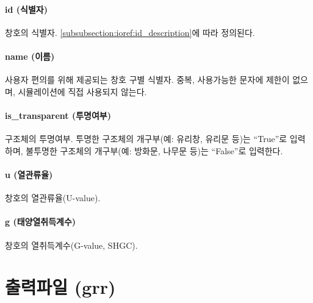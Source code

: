 
\paragraph{id (식별자)} 창호의 식별자. \ref{subsubsection:ioref:id_description}에 따라 정의된다.

\paragraph{name (이름)} 사용자 편의를 위해 제공되는 창호 구별 식별자. 중복, 사용가능한 문자에 제한이 없으며, 시뮬레이션에 직접 사용되지 않는다.

\paragraph{is\_transparent (투명여부)} 구조체의 투명여부. 투명한 구조체의 개구부(예: 유리창, 유리문 등)는 ``True''로 입력하며, 불투명한 구조체의 개구부(예: 방화문, 나무문 등)는 ``False''로 입력한다.

\paragraph{u (열관류율)} 창호의 열관류율(U-value).

\paragraph{g (태양열취득계수)} 창호의 열취득계수(G-value, SHGC).


\section{출력파일 (grr)}
\label{section:format-explanation-grr}

